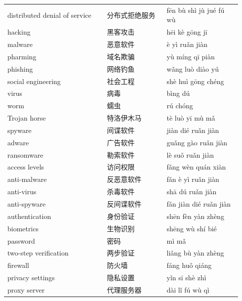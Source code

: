 \documentclass[11pt]{article}
\begin{document}
\begin{longtable}{@{}p{0.40\linewidth}p{0.24\linewidth}p{0.30\linewidth}@{}}
distributed denial of service & 分布式拒绝服务 & fēn bù shì jù jué fú wù \\
hacking & 黑客攻击 & hēi kè gōng jī \\
malware & 恶意软件 & è yì ruǎn jiàn \\
pharming & 域名欺骗 & yù míng qī piàn \\
phishing & 网络钓鱼 & wǎng luò diào yú \\
social engineering & 社会工程 & shè huì gōng chéng \\
virus & 病毒 & bìng dú \\
worm & 蠕虫 & rú chóng \\
Trojan horse & 特洛伊木马 & tè luò yī mù mǎ \\
spyware & 间谍软件 & jiàn dié ruǎn jiàn \\
adware & 广告软件 & guǎng gào ruǎn jiàn \\
ransomware & 勒索软件 & lè suǒ ruǎn jiàn \\
access levels & 访问权限 & fǎng wèn quán xiàn \\
anti-malware & 反恶意软件 & fǎn è yì ruǎn jiàn \\
anti-virus & 杀毒软件 & shā dú ruǎn jiàn \\
anti-spyware & 反间谍软件 & fǎn jiàn dié ruǎn jiàn \\
authentication & 身份验证 & shēn fèn yàn zhèng \\
biometrics & 生物识别 & shēng wù shí bié \\
password & 密码 & mì mǎ \\
two-step verification & 两步验证 & liǎng bù yàn zhèng \\
firewall & 防火墙 & fáng huǒ qiáng \\
privacy settings & 隐私设置 & yǐn sī shè zhì \\
proxy server & 代理服务器 & dài lǐ fú wù qì \\
\end{longtable}
\end{document}
